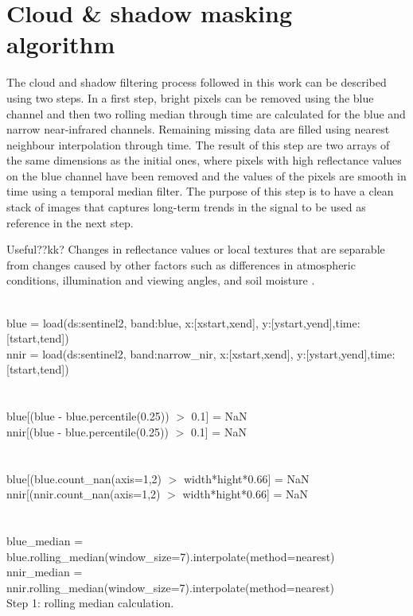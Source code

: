 \documentclass[essd, manuscript]{copernicus}
\begin{document}


\appendix
\section{Cloud \& shadow masking algorithm} %

The cloud and shadow filtering process followed in this work can be described using two steps. In a first step, bright pixels can be removed using the blue channel and then two rolling median through time are calculated for the blue and narrow near-infrared channels. Remaining missing data are filled using nearest neighbour interpolation through time. The result of this step are two arrays of the same dimensions as the initial ones, where pixels with high reflectance values on the blue channel have been removed and the values of the pixels are smooth in time using a temporal median filter. The purpose of this step is to have a clean stack of images that captures long-term trends in the signal to be used as reference in the next step.

Useful??kk? Changes in reflectance values or local textures that are separable from changes caused by other factors such as differences in atmospheric conditions, illumination and viewing angles, and soil moisture \citep{deng2008pca}.

\begin{algorithm}[H]
\SetAlgoLined
 \\
 blue = load(ds:sentinel2, band:blue, x:[xstart,xend], y:[ystart,yend],time:[tstart,tend])\\
 nnir = load(ds:sentinel2, band:narrow\_nir, x:[xstart,xend], y:[ystart,yend],time:[tstart,tend])\\
 \\
 \\
 blue[(blue - blue.percentile(0.25)) $>$ 0.1] = NaN\\
 nnir[(blue - blue.percentile(0.25)) $>$ 0.1] = NaN\\
 \\
 \\
 blue[(blue.count\_nan(axis=1,2) $>$ width*hight*0.66] = NaN\\
 nnir[(nnir.count\_nan(axis=1,2) $>$ width*hight*0.66] = NaN\\
 \\
 \\
 blue\_median = blue.rolling\_median(window\_size=7).interpolate(method=nearest)\\
 nnir\_median = nnir.rolling\_median(window\_size=7).interpolate(method=nearest)\\
 \caption{Step 1: rolling median calculation.}
\end{algorithm}
\end{document}
